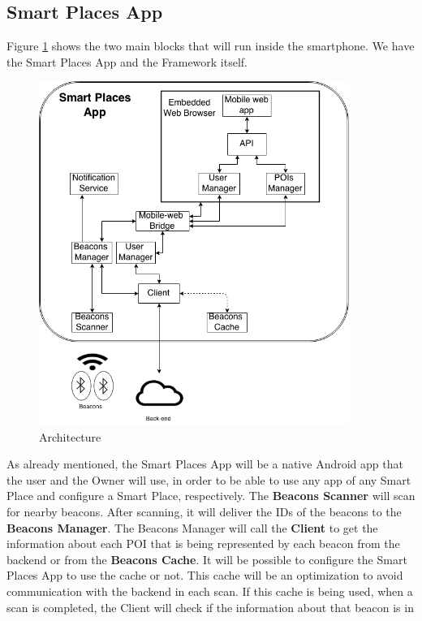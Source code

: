 \subsection{Smart Places App}
\label{sub:smart_places_app}
Figure \ref{fig:architecture} shows the two main
blocks that will run inside the smartphone.
We have the Smart Places App and the Framework itself.
\begin{figure}[!ht]
  \centering
    \includegraphics[width=0.9\textwidth]{img/architecture}
    \caption{Architecture}
    \label{fig:architecture}
\end{figure}
As already mentioned, the Smart Places App will be a native
Android app that the user and the Owner 
will use,
in order to be able to use any app of any Smart Place
and configure a Smart Place, respectively.
The \textbf{Beacons Scanner} will scan for nearby
beacons. After scanning, it will deliver the IDs
of the beacons to the \textbf{Beacons Manager}.
The Beacons Manager will call the \textbf{Client} to
get the information about each POI that is being
represented by each beacon from the backend or
from the \textbf{Beacons Cache}. It will be possible to
configure the Smart Places App to use the cache or not.
This cache will be an optimization to avoid communication
with the backend in each scan. If this cache is being
used, when a scan is completed, the Client will
check if the information about that beacon is in
